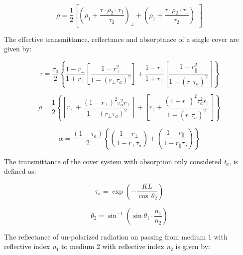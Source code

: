 \begin{equation}
\rho  = \frac{1}{2}\left[ {{{\left( {{\rho_1} + \frac{{\tau  \cdot {\rho_2} \cdot {\tau_1}}}{{{\tau_2}}}} \right)}_ \bot } + {{\left( {{\rho_1} + \frac{{\tau  \cdot {\rho_2} \cdot {\tau_1}}}{{{\tau_2}}}} \right)}_\parallel }} \right]
\end{equation}

The effective transmittance, reflectance and absorptance of a single cover are given by:

\begin{equation}
\tau  = \frac{{{\tau_a}}}{2}\left\{ {\frac{{1 - {r_ \bot }}}{{1 + {r_ \bot }}}\left[ {\frac{{1 - r_ \bot ^2}}{{1 - {{\left( {{r_ \bot }{\tau_a}} \right)}^2}}}} \right] + \frac{{1 - {r_\parallel }}}{{1 + {r_\parallel }}}\left[ {\frac{{1 - r_\parallel ^2}}{{1 - {{\left( {{r_\parallel }{\tau_a}} \right)}^2}}}} \right]} \right\}
\end{equation}

\begin{equation}
\rho  = \frac{1}{2}\left\{ {\left[ {{r_ \bot } + \frac{{{{\left( {1 - {r_ \bot }} \right)}^2}\tau_a^2{r_ \bot }}}{{1 - {{\left( {{r_ \bot }{\tau_a}} \right)}^2}}}} \right] + \left[ {{r_\parallel } + \frac{{{{\left( {1 - {r_\parallel }} \right)}^2}\tau_a^2{r_\parallel }}}{{1 - {{\left( {{r_\parallel }{\tau_a}} \right)}^2}}}} \right]} \right\}
\end{equation}

\begin{equation}
\alpha  = \frac{{\left( {1 - {\tau_a}} \right)}}{2}\left\{ {\left( {\frac{{1 - {r_ \bot }}}{{1 - {r_ \bot }{\tau_a}}}} \right) + \left( {\frac{{1 - {r_\parallel }}}{{1 - {r_\parallel }{\tau_a}}}} \right)} \right\}
\end{equation}

The transmittance of the cover system with absorption only considered \emph{t}\(_{a}\), is defined as:

\begin{equation}
{\tau_a} = \exp \left( { - \frac{{KL}}{{\cos \,{\theta_2}}}} \right)
\end{equation}

\begin{equation}
{\theta_2} = {\sin ^{ - 1}}\left( {\sin {\theta_1} \cdot \frac{{{n_1}}}{{{n_2}}}} \right)
\end{equation}

The reflectance of un-polarized radiation on passing from medium 1 with reflective index \emph{n}\(_{1}\) to medium 2 with reflective index \emph{n}\(_{2}\) is given by:

